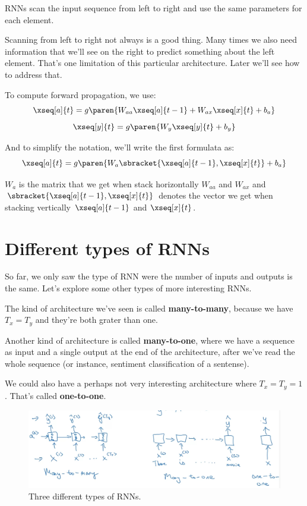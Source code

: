\documentclass[12pt, a4paper, oneside]{book}
\begin{document}
RNNs scan the input sequence from left to right and use the same parameters
for each element.

Scanning from left to right not always is a good thing. Many times we also need
information that we'll see on the right to predict something about the left
element. That's one limitation of this particular architecture. Later we'll see
how to address that.

To compute forward propagation, we use:
\[
\xseq[a]{t}=g\paren{W_{aa}\xseq[a]{t-1}+W_{ax}\xseq[x]{t}+b_{a}}
\]
\[
\xseq[y]{t}=g\paren{W_{y}\xseq[y]{t}+b_{y}}
\]

And to simplify the notation, we'll write the first formulata as:
\[
\xseq[a]{t}=g\paren{W_{a}\sbracket{\xseq[a]{t-1}, \xseq[x]{t}}+b_{a}}
\]

$W_a$ is the matrix that we get when stack horizontally $W_{aa}$ and $W_{ax}$
and $\sbracket{\xseq[a]{t-1}, \xseq[x]{t}}$ denotes the vector we get when
stacking vertically $\xseq[a]{t-1}$ and $\xseq[x]{t}$.

\section{Different types of RNNs}%
\label{sec:different_types_of_rnns}

So far, we only saw the type of RNN were the number of inputs and outputs is the
same. Let's explore some other types of more interesting RNNs.

The kind of architecture we've seen is called \textbf{many-to-many}, because we
have $T_x=T_y$ and they're both grater than one.

Another kind of architecture is called \textbf{many-to-one}, where we have a
sequence as input and a single output at the end of the architecture, after
we've read the whole sequence (or instance, sentiment classification of a
sentense).

We could also have a perhaps not very interesting architecture where
$T_x=T_y=1$. That's called \textbf{one-to-one}.

\begin{figure}[h]
\centering
\includegraphics[scale=0.4]{Res/RNN-types.jpg}
\caption{Three different types of RNNs.}
\label{RNN-types.jpg}
\end{figure}
\end{document}
